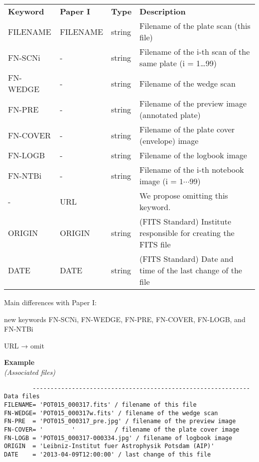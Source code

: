 \documentclass[11pt]{ivoa}
\newenvironment{fitsexample}[1]
{\bigskip\noindent\textbf{Example}\\\textit{(#1\smallskip)}}
{\medskip}
\begin{document}
\begin{inlinetable}
\footnotesize
\begin{tabular}{lllp{}}
\sptablerule
\textbf{Keyword}&\textbf{Paper I}&\textbf{Type}&\textbf{Description}\\
\sptablerule
FILENAME &FILENAME &string    &Filename of the plate scan (this file)\\
FN-SCNi  &-        &string    &
  Filename of the i-th scan of the same plate (i = 1…99)\\
FN-WEDGE &-        &string    &Filename of the wedge scan\\
FN-PRE   &-        &string    &
  Filename of the preview image (annotated plate)\\
FN-COVER &-        &string    &
  Filename of the plate cover (envelope) image\\
FN-LOGB  &-        &string    &Filename of the logbook image\\
FN-NTBi  &-        &string    &
  Filename of the i-th notebook image (i = $1\cdots 99$)\\
-        &URL      &          &We propose omitting this keyword.\\
ORIGIN   &ORIGIN   &string    &
  (FITS Standard) Institute responsible for creating the FITS file\\
DATE     &DATE     &string    &
  (FITS Standard) Date and time of the last change of the file \\
\end{tabular}
\end{inlinetable}

Main differences with Paper I:

new keywords FN-SCNi, FN-WEDGE, FN-PRE, FN-COVER, FN-LOGB, and FN-NTBi

URL → omit


\begin{fitsexample}{Associated files}
\begin{lstlisting}
        ------------------------------------------------------------- Data files
FILENAME= 'POT015_000317.fits' / filename of this file
FN-WEDGE= 'POT015_000317w.fits' / filename of the wedge scan
FN-PRE  = 'POT015_000317_pre.jpg' / filename of the preview image
FN-COVER= '        '           / filename of the plate cover image
FN-LOGB = 'POT015_000317-000334.jpg' / filename of logbook image
ORIGIN  = 'Leibniz-Institut fuer Astrophysik Potsdam (AIP)'
DATE    = '2013-04-09T12:00:00' / last change of this file
\end{lstlisting}
\end{fitsexample}
\end{document}
